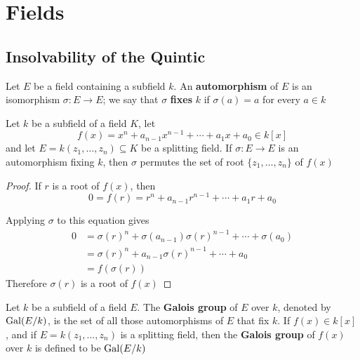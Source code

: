 \documentclass[11pt]{article}
\begin{document}
\section{Fields}
\label{sec:orgcb26ce4}
\subsection{Insolvability of the Quintic}
\label{sec:org569a201}
\begin{definition}[]
Let \(E\) be a field containing a subfield \(k\). An \textbf{automorphism} of \(E\) is an
isomorphism \(\sigma:E\to E\); we say that \(\sigma\) \textbf{fixes} \(k\) if \(\sigma(a)=a\) for every 
\(a\in k\)
\end{definition}

\begin{proposition}[]
\label{prop4.1}
Let \(k\) be a subfield of a field \(K\), let 
\begin{equation*}
f(x)=x^n+a_{n-1}x^{n-1}+\cdots+a_1x+a_0\in k[x]
\end{equation*}
and let \(E=k(z_1,\dots,z_n)\subseteq K\) be a splitting field. If 
\(\sigma:E\to E\) is an automorphism fixing \(k\), then \(\sigma\) permutes the set of root 
\(\{z_1,\dots,z_n\}\) of \(f(x)\)
\end{proposition}

\begin{proof}
If \(r\) is a root of \(f(x)\), then 
\begin{equation*}
0=f(r)=r^n+a_{n-1}r^{n-1}+\cdots+a_1r+a_0
\end{equation*}

Applying \(\sigma\) to this equation gives
\begin{align*}
0&=\sigma(r)^n+\sigma(a_{n-1})\sigma(r)^{n-1}+\cdots+\sigma(a_0)\\
&=\sigma(r)^n+a_{n-1}\sigma(r)^{n-1}+\cdots+a_0\\
&=f(\sigma(r))
\end{align*}
Therefore \(\sigma(r)\) is a root of \(f(x)\)
\end{proof}

\begin{definition}[]
Let \(k\) be a subfield of a field \(E\). The \textbf{Galois group} of \(E\) over \(k\),
denoted by \(\operatorname{Gal}(E/k)\), is the set of all those automorphisms of \(E\) that
fix \(k\). If \(f(x)\in k[x]\), and if \(E=k(z_1,\dots,z_n)\) is a splitting
field, then the \textbf{Galois group} of \(f(x)\) over \(k\) is defined to be \(\operatorname{Gal}(E/k)\)
\end{definition}
\end{document}
